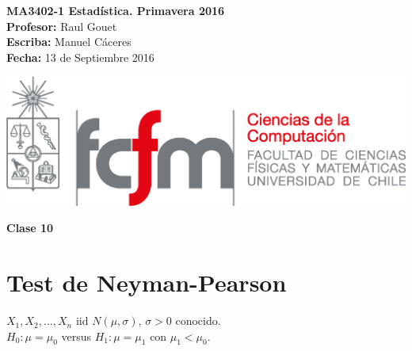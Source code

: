 \documentclass[10pt]{article}
\theoremstyle{plain}
\theoremstyle{definition}
\newcommand{\catnum}{10} %
\newcommand{\fecha}{13 de Septiembre 2016 }
\begin{document}
\vspace*{-1.2 cm}
\begin{minipage}{0.6\textwidth}
\begin{flushleft}
\hspace*{-0.5cm}\textbf{MA3402-1 Estadística. Primavera 2016}\\
\hspace*{-0.5cm}\textbf{Profesor:} Raul Gouet\\
\hspace*{-0.5cm}\textbf{Escriba:} Manuel Cáceres\\
\hspace*{-0.5cm}\textbf{Fecha:} \fecha
\end{flushleft}
\end{minipage}
\begin{minipage}{0.36\textwidth}
\begin{flushright}
\includegraphics[scale=0.3]{imagenes/fcfm_dcc}
\end{flushright}
\end{minipage}
\bigskip

\begin{center}
\LARGE\textbf{Clase \catnum}
\end{center}
\section{Test de Neyman-Pearson}
$X_{1}, X_{2}, \ldots, X_{n}$ iid $N(\mu,\sigma)$, $\sigma>0$ conocido.\\
$H_{0}: \mu = \mu_{0}$ versus $H_{1}: \mu = \mu_{1}$ con $\mu_{1}<\mu_{0}$.\\
\end{document}
